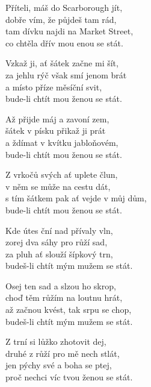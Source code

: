 
\ve{}
Příteli, máš do Scarborough jít, \\
dobře vím, že půjdeš tam rád, \\
tam dívku najdi na Market Street, \\
co chtěla dřív mou enou se stát. 

\ve{}
Vzkaž ji, ať šátek začne mi šít, \\
za jehlu rýč však smí jenom brát \\
a místo příze měsíční svit, \\
bude-li chtít mou ženou se stát. 

\ve{}
Až přijde máj a zavoní zem, \\
šátek v písku přikaž ji prát \\
a ždímat v kvítku jabloňovém, \\
bude-li chtít mou ženou se stát. 

\ve{}
Z vrkočů svých ať uplete člun, \\
v něm se může na cestu dát, \\
s tím šátkem pak ať vejde v můj dům, \\
bude-li chtít mou ženou se stát. 

\ve{}
Kde útes ční nad přívaly vln, \\
zorej dva sáhy pro růží sad, \\
za pluh ať slouží šípkový trn, \\
budeš-li chtít mým mužem se stát. 

\ve{}
Osej ten sad a slzou ho skrop, \\
choď těm růžím na loutnu hrát, \\
až začnou kvést, tak srpu se chop, \\
budeš-li chtít mým mužem se stát. 

\ve{}
Z trní si lůžko zhotovit dej, \\
druhé z růží pro mě nech stlát, \\
jen pýchy své a boha se ptej, \\
proč nechci víc tvou ženou se stát. 

\esong{}
